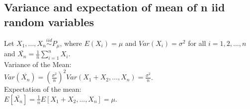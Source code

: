 \subsection*{Variance and expectation of mean of n iid random variables}
Let $X_1, ..., X_n \stackrel{iid}{\sim} P_{\mu}$, where $E(X_i)=\mu$ and $Var(X_i)=\sigma^2$ for all $i=1,2,...,n$ and $\bar{X_n}= \frac{1}{n} \sum_{i=1}^{n} X_i$.\\

Variance of the Mean:\\

$Var(\overline{X_n})=(\frac{\sigma^2}{n})^2 Var(X_1 + X_2,...,X_n) =  \frac{\sigma^2}{n}$.\\

Expectation of the mean:\\

$E[\bar{X_n}]=\frac{1}{n}E[X_1 + X_2,...,X_n] = \mu$.